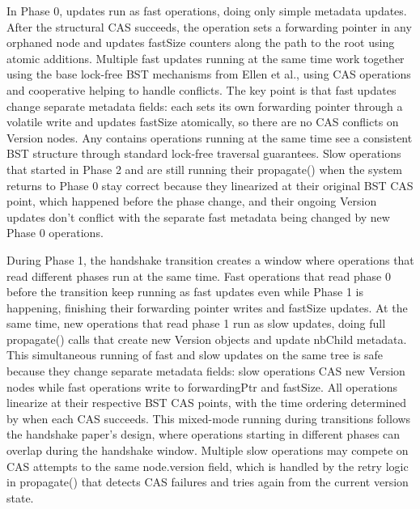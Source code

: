 \documentclass[acmsmall,screen,nonacm]{acmart}
\newcommand{\codestyle}[1]{{{\fontsize{9}{10}\ttfamily #1}}}
\begin{document}
In Phase 0, updates run as fast operations, doing only simple metadata updates. After the structural CAS succeeds, the operation sets a forwarding pointer in any orphaned node and updates \codestyle{fastSize} counters along the path to the root using atomic additions. Multiple fast updates running at the same time work together using the base lock-free BST mechanisms from Ellen et al., using CAS operations and cooperative helping to handle conflicts. The key point is that fast updates change separate metadata fields: each sets its own forwarding pointer through a volatile write and updates \codestyle{fastSize} atomically, so there are no CAS conflicts on Version nodes. Any \codestyle{contains} operations running at the same time see a consistent BST structure through standard lock-free traversal guarantees. Slow operations that started in Phase 2 and are still running their \codestyle{propagate()} when the system returns to Phase 0 stay correct because they linearized at their original BST CAS point, which happened before the phase change, and their ongoing Version updates don't conflict with the separate fast metadata being changed by new Phase 0 operations.

During Phase 1, the handshake transition creates a window where operations that read different phases run at the same time. Fast operations that read phase 0 before the transition keep running as fast updates even while Phase 1 is happening, finishing their forwarding pointer writes and \codestyle{fastSize} updates. At the same time, new operations that read phase 1 run as slow updates, doing full \codestyle{propagate()} calls that create new Version objects and update \codestyle{nbChild} metadata. This simultaneous running of fast and slow updates on the same tree is safe because they change separate metadata fields: slow operations CAS new Version nodes while fast operations write to \codestyle{forwardingPtr} and \codestyle{fastSize}. All operations linearize at their respective BST CAS points, with the time ordering determined by when each CAS succeeds. This mixed-mode running during transitions follows the handshake paper's design, where operations starting in different phases can overlap during the handshake window. Multiple slow operations may compete on CAS attempts to the same \codestyle{node.version} field, which is handled by the retry logic in \codestyle{propagate()} that detects CAS failures and tries again from the current version state.
\end{document}
